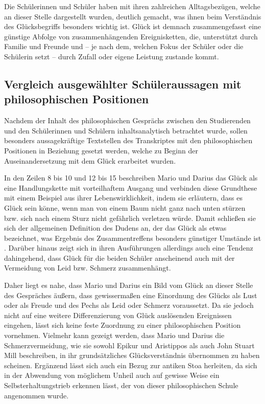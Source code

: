 Die Schülerinnen und Schüler haben mit ihren zahlreichen Alltagsbezügen, welche an dieser Stelle dargestellt wurden, deutlich gemacht, was ihnen beim Verständnis des Glücksbegriffs besonders wichtig ist. 
Glück ist demnach zusammengefasst eine günstige Abfolge von zusammenhängenden Ereignisketten, die, unterstützt durch Familie und Freunde und -- je nach dem, welchen Fokus der Schüler oder die Schülerin setzt -- durch Zufall oder eigene Leistung zustande kommt. 


\newpage



\subsection{Vergleich ausgewählter Schüleraussagen mit philosophischen Positionen}

Nachdem der Inhalt des philosophischen Gesprächs zwischen den Studierenden und den Schülerinnen und Schülern inhaltsanalytisch betrachtet wurde, sollen besonders aussagekräftige Textstellen des Transkriptes mit den philosophischen Positionen in Beziehung gesetzt werden, welche zu Beginn der Auseinandersetzung mit dem Glück erarbeitet wurden.

In den Zeilen 8 bis 10 und 12 bis 15 beschreiben Mario und Darius das Glück als eine Handlungskette mit vorteilhaftem Ausgang und verbinden diese Grundthese mit einem Beispiel aus ihrer Lebenswirklichkeit, indem sie erläutern, dass es Glück sein könne, wenn man von einem Baum nicht ganz nach unten stürzen bzw. sich nach einem Sturz nicht gefährlich verletzen würde. 
Damit schließen sie sich der allgemeinen Definition des Dudens an, der das Glück als etwas bezeichnet, \glqq was Ergebnis des Zusammentreffens besonders günstiger Umstände ist\grqq{} \cite{D16}.
Darüber hinaus zeigt sich in ihren Ausführungen allerdings auch eine Tendenz dahingehend, dass Glück für die beiden Schüler anscheinend auch mit der Vermeidung von Leid bzw. Schmerz zusammenhängt. 

Daher liegt es nahe, dass Mario und Darius ein Bild vom Glück an dieser Stelle des Gespräches äußern, dass gewissermaßen eine Einordnung des Glücks als Lust oder als Freude und des Pechs als Leid oder Schmerz voraussetzt. 
Da sie jedoch nicht auf eine weitere Differenzierung von Glück auslösenden Ereignissen eingehen, lässt sich keine feste Zuordnung zu einer philosophischen Position vornehmen. 
Vielmehr kann gezeigt werden, dass Mario und Darius die Schmerzvermeidung, wie sie sowohl Epikur und Aristippos als auch John Stuart Mill beschreiben, in ihr grundsätzliches Glücksverständnis übernommen zu haben scheinen. 
Ergänzend lässt sich auch ein Bezug zur antiken Stoa herleiten, da sich in der Abwendung von möglichem Unheil auch auf gewisse Weise ein Selbsterhaltungstrieb erkennen lässt, der von dieser philosophischen Schule angenommen wurde. 

